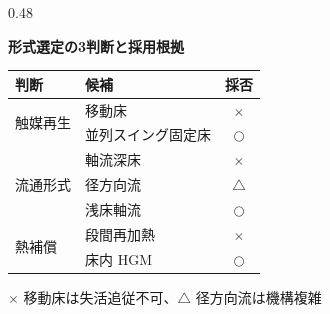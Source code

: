 \begin{frame}[t]
\begin{columns}[T,onlytextwidth]
\begin{column}{0.48\textwidth}
      \vspace{0.6em}
      \raggedright
      {\bfseries 形式選定の3判断と採用根拠}\par
      \vspace{0.3em}
      {\scriptsize\renewcommand{\arraystretch}{1.0}%
       \begin{tabular}{@{}l l c@{}}
         \toprule
         判断 & 候補 & 採否 \\
         \midrule
         \multirow{2}{*}{触媒再生}
            & 移動床            & $\times$ \\
            & 並列スイング固定床 & $\bigcirc$ \\
         \midrule
         \multirow{3}{*}{流通形式}
            & 軸流深床   & $\times$ \\
            & 径方向流   & $\triangle$ \\
            & 浅床軸流   & $\bigcirc$ \\
         \midrule
         \multirow{2}{*}{熱補償}
            & 段間再加熱 & $\times$ \\
            & 床内 HGM   & $\bigcirc$ \\
         \bottomrule
       \end{tabular}}\par
      \vspace{0.25em}
      {\tiny $\times$ 移動床は失活追従不可、$\triangle$ 径方向流は機構複雑}\par
    \end{column}


\end{columns}
\end{frame}

